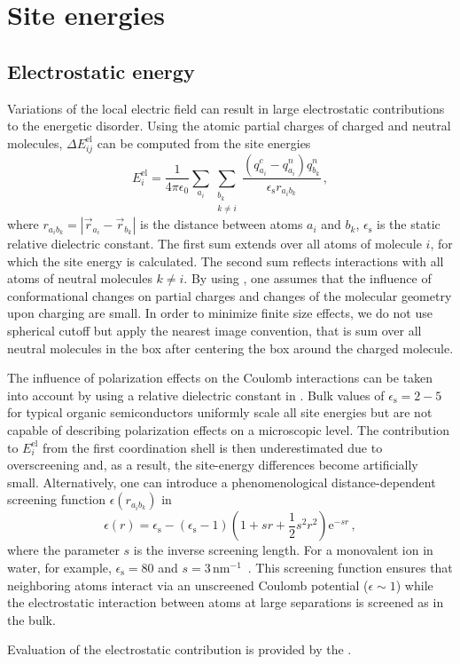 \section{Site energies}
\label{sec:site_energies}

\subsection{Electrostatic energy}
\label{sec:electrostatic}
Variations of the local electric field can result in large electrostatic contributions to the energetic disorder. Using the atomic partial charges of charged and neutral molecules, $\Delta E_{ij}^\text{el}$ can be computed from the site energies~\cite{kirkpatrick_columnar_2008}
\begin{equation}
E_{i}^\text{el}  = \frac{1}{4 \pi \epsilon_0} \sum_{a_i} \sum_{\substack{b_k   \\ k\neq i }}
\frac{ \left( q^c_{a_i} - q^n_{a_i} \right) q^n_{b_k}}{ \epsilon_\text{s} r_{a_i b_k}} 
\, ,
\label{equ:estatic}
\end{equation}
where $r_{a_i b_k}=|\vec{r}_{a_i} - \vec{r}_{b_k}|$ is the distance between atoms $a_i$ and $b_k$,   $\epsilon_\text{s}$ is the static relative dielectric constant.
%
The first sum extends over all atoms of molecule $i$, for which the site energy is calculated. The second sum reflects interactions with all atoms of neutral molecules $k \ne i$. By using , one assumes that the influence of conformational changes on partial charges and changes of the molecular geometry upon charging are small. In order to minimize finite size effects, we do not use spherical cutoff but apply the nearest image convention, that is sum over all neutral molecules in the box after centering the box around the charged molecule. 

The influence of polarization effects on the Coulomb interactions can be taken into account by using a relative dielectric constant in . Bulk values of  $\epsilon_\text{s} = 2-5$ for typical organic semiconductors uniformly scale all site energies but are not capable of describing polarization effects on a microscopic level. 
The contribution to $E_i^\text{el}$ from the first coordination shell is then underestimated due to overscreening and, as a result, the site-energy differences become artificially small. Alternatively, one can introduce a phenomenological distance-dependent screening function $\epsilon(r_{a_i b_k})$ in~~\cite{nagata_atomistic_2008}
\begin{equation}
\epsilon(r)=\epsilon_{\text{s}} - (\epsilon_{\text{s}} - 1)
\left( 1 + sr + \frac{1}{2}s^2r^2 \right) 
\mathrm{e}^{ -sr}\,,
\label{equ:epss}
\end{equation}
where the parameter $s$ is the inverse screening length. For a monovalent ion in water, for example, $\epsilon_{\text{s}}=80$ and $s=3\,\textrm{nm}^{-1}$~\cite{daggett_molecular_1991}. This screening function ensures that neighboring atoms interact via an unscreened Coulomb potential ($\epsilon \sim 1$) while the electrostatic interaction between atoms at large separations is screened as in the bulk. 

Evaluation of the electrostatic contribution is provided by the \estat \calculator.
